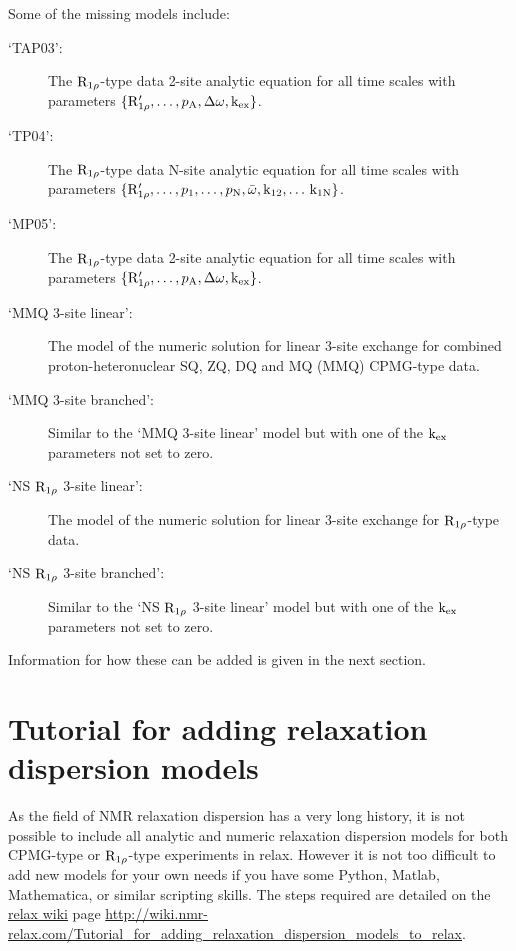 Some of the missing models include:
\begin{description}
\item[`TAP03':]  The $\mathrm{R}_{1\rho}$-type data \citet{Trott03} 2-site analytic equation for all time scales with parameters $\{\mathrm{R}_{1\rho}', \dots, p_\textrm{A}, \Delta\omega, \textrm{k}_\textrm{ex}\}$.
\item[`TP04':]  The $\mathrm{R}_{1\rho}$-type data \citet{TrottPalmer04} N-site analytic equation for all time scales with parameters $\{\mathrm{R}_{1\rho}', \dots, p_\textrm{1}, \dots, p_\textrm{N}, \bar\omega, \textrm{k}_\textrm{12}, \dots\, \textrm{k}_\textrm{1N}\}$.
\item[`MP05':]  The $\mathrm{R}_{1\rho}$-type data \citet{MiloushevPalmer05} 2-site analytic equation for all time scales with parameters $\{\mathrm{R}_{1\rho}', \dots, p_\textrm{A}, \Delta\omega, \textrm{k}_\textrm{ex}\}$.
\item[`MMQ 3-site linear':]  The model of the numeric solution for linear 3-site exchange for combined proton-heteronuclear SQ, ZQ, DQ and MQ (MMQ) CPMG-type data.
\item[`MMQ 3-site branched':]  Similar to the `MMQ 3-site linear' model but with one of the $\textrm{k}_\textrm{ex}$ parameters not set to zero.
\item[`NS $\mathrm{R}_{1\rho}$ 3-site linear':]  The model of the numeric solution for linear 3-site exchange for $\mathrm{R}_{1\rho}$-type data.
\item[`NS $\mathrm{R}_{1\rho}$ 3-site branched':]  Similar to the `NS $\mathrm{R}_{1\rho}$ 3-site linear' model but with one of the $\textrm{k}_\textrm{ex}$ parameters not set to zero.
\end{description}

Information for how these can be added is given in the next section.



\section{Tutorial for adding relaxation dispersion models}
\label{sect: dispersion: model tutorial}

As the field of NMR relaxation dispersion has a very long history, it is not possible to include all analytic and numeric relaxation dispersion models for both CPMG-type or $\mathrm{R}_{1\rho}$-type experiments in relax.  However it is not too difficult to add new models for your own needs if you have some Python, Matlab, Mathematica, or similar scripting skills.  The steps required are detailed on the \href{http://wiki.nmr-relax.com/}{relax wiki} page \url{http://wiki.nmr-relax.com/Tutorial\_for\_adding\_relaxation\_dispersion\_models\_to\_relax}.


